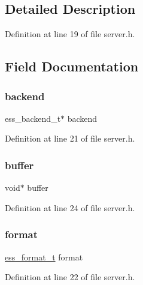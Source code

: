 \subsection{Detailed Description}


Definition at line 19 of file server.\+h.



\subsection{Field Documentation}
\mbox{\label{structess__server_ab2b85d146ada2907a81371aace6e926d}} 
\subsubsection{\texorpdfstring{backend}{backend}}
{\footnotesize\ttfamily ess\+\_\+backend\+\_\+t$\ast$ backend}



Definition at line 21 of file server.\+h.

\mbox{\label{structess__server_a368f7094dc38acca20612bbb392552f4}} 
\subsubsection{\texorpdfstring{buffer}{buffer}}
{\footnotesize\ttfamily void$\ast$ buffer}



Definition at line 24 of file server.\+h.

\mbox{\label{structess__server_abb4395d1c05d3bbc2e1d011507ddd19b}} 
\subsubsection{\texorpdfstring{format}{format}}
{\footnotesize\ttfamily \hyperlink{ess__format_8h_ab03f24cb5d42f4448f713bf1ec178163}{ess\+\_\+format\+\_\+t} format}



Definition at line 22 of file server.\+h.

